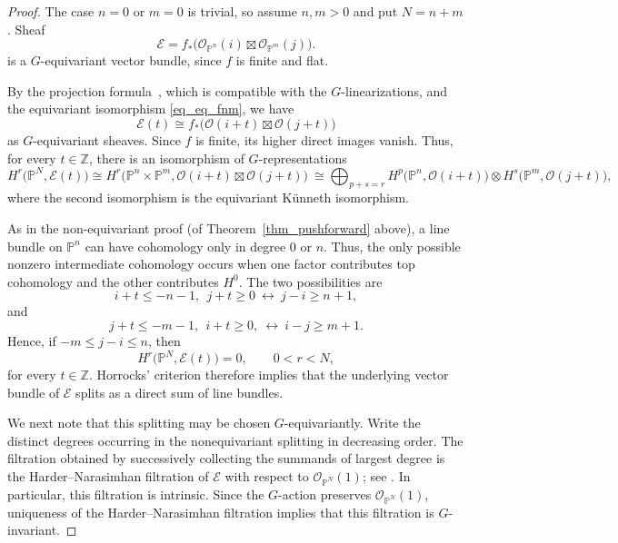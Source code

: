 \documentclass{article}
\newcommand{\mcO}{\mathcal{O}}
\newcommand{\PP}{\mathbb{P}}
\theoremstyle{definition}
\theoremstyle{definition}
\begin{document}
\begin{proof}
The case $n=0$ or $m=0$ is trivial, so assume $n,m>0$ and put $N=n+m$.
Sheaf
\[
\mathcal{E}=f_*\bigl(\mcO_{\PP^n}(i)\boxtimes\mcO_{\PP^m}(j)\bigr).
\]
is a $G$-equivariant vector bundle,
since $f$ is finite and flat.

By the projection formula~\cite[Tag~01E6, Lemma~20.54.2]{stacks-project}, which is compatible with the $G$-linearizations, and the equivariant isomorphism \eqref{eq_eq_fnm}, we have
\[
\mathcal{E}(t)
\cong
f_{\ast}\bigl(\mcO(i+t)\boxtimes\mcO(j+t)\bigr)
\]
as $G$-equivariant sheaves.  Since $f$ is finite, its higher direct images vanish.  Thus, for every $t\in\mathbb Z$, there is an isomorphism of $G$-representations
\begin{equation*}
H^r\bigl(\PP^N,\mathcal E(t)\bigr)
\cong H^r\bigl(\PP^n\times\PP^m,
\mcO(i+t)\boxtimes\mcO(j+t)\bigr)\
\cong \bigoplus_{p+s=r}
H^p\bigl(\PP^n,\mcO(i+t)\bigr)\otimes
H^s\bigl(\PP^m,\mcO(j+t)\bigr),
\end{equation*}
where the second isomorphism is the equivariant K\"unneth isomorphism.

As in the non-equivariant proof (of Theorem~\ref{thm_pushforward} above), a line bundle on $\PP^n$ can have cohomology only in degree $0$ or $n$. Thus, the only possible nonzero intermediate cohomology occurs when one factor contributes top cohomology and the other contributes $H^0$.  The two possibilities are
\[
i+t\le -n-1,\ \  j+t\ge 0 \ \leftrightarrow \ j-i\ge n+1,
\]
and
\[
j+t\le -m-1,\ \  i+t\ge 0, \ \leftrightarrow \ i-j\ge m+1.
\]
Hence, if $-m\le j-i\le n$,
then
\[
H^r\bigl(\PP^N,\mathcal E(t)\bigr)=0,
\qquad 0<r<N,
\]
for every $t\in\mathbb Z$.  Horrocks' criterion therefore implies that the underlying vector bundle of $\mathcal E$ splits as a direct sum of line bundles.


We next note that this splitting may be chosen $G$-equivariantly. Write the distinct degrees occurring in the nonequivariant splitting in decreasing order.
The filtration obtained by successively collecting the summands of largest degree is the Harder--Narasimhan filtration of $\mathcal{E}$
with respect to $\mcO_{\PP^N}(1)$;
see \cite[Theorem~1.6.7 and Definition--Corollary~1.6.9]{HuLe}. In particular, this filtration is intrinsic.
Since the $G$-action preserves
$\mcO_{\PP^N}(1)$, uniqueness of the Harder--Narasimhan filtration
implies that this filtration is $G$-invariant.


\end{proof}
\end{document}
